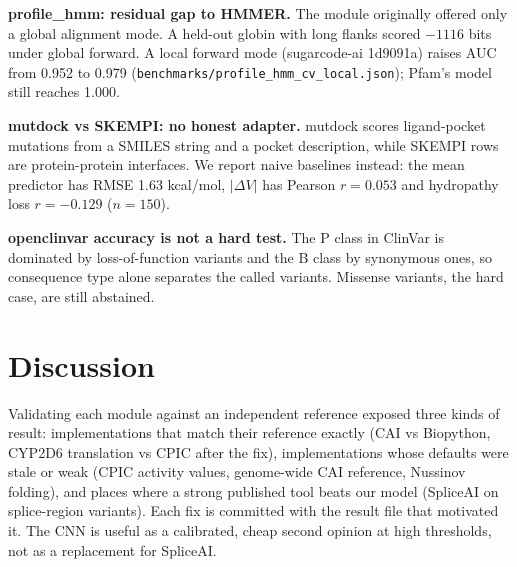 \documentclass[11pt]{article}
\begin{document}
\textbf{profile\_hmm: residual gap to HMMER.} The module originally offered only a global
alignment mode. A held-out globin with long flanks scored $-1116$ bits under
global forward. A local forward mode (sugarcode-ai 1d9091a) raises AUC from 0.952 to 0.979
(\texttt{benchmarks/profile\_hmm\_cv\_local.json}); Pfam's model still reaches 1.000.

\textbf{mutdock vs SKEMPI: no honest adapter.} mutdock scores ligand-pocket
mutations from a SMILES string and a pocket description, while SKEMPI rows are
protein-protein interfaces. We report naive baselines instead: the mean
predictor has RMSE 1.63 kcal/mol, $|\Delta V|$ has Pearson $r=0.053$ and
hydropathy loss $r=-0.129$ ($n=150$).

\textbf{openclinvar accuracy is not a hard test.} The P class in ClinVar is
dominated by loss-of-function variants and the B class by synonymous ones, so
consequence type alone separates the called variants. Missense variants, the
hard case, are still abstained.









\section{Discussion}
Validating each module against an independent reference exposed three kinds of result: implementations that match their reference exactly (CAI vs Biopython, CYP2D6 translation vs CPIC after the fix), implementations whose defaults were stale or weak (CPIC activity values, genome-wide CAI reference, Nussinov folding), and places where a strong published tool beats our model (SpliceAI on splice-region variants). Each fix is committed with the result file that motivated it. The CNN is useful as a calibrated, cheap second opinion at high thresholds, not as a replacement for SpliceAI.
\end{document}
